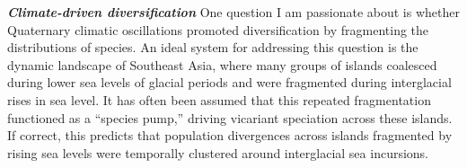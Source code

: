 \textit{\textbf{Climate-driven diversification}}
One question I am passionate about is whether Quaternary climatic oscillations
promoted diversification by fragmenting the distributions of species.
An ideal system for addressing this question is the dynamic landscape of
Southeast Asia, where many groups of islands coalesced during lower sea levels
of glacial periods and were fragmented during interglacial rises in sea level.
It has often been assumed that this repeated fragmentation functioned as a
``species pump,'' driving vicariant speciation across these islands.
If correct, this predicts that population divergences across islands fragmented
by rising sea levels were temporally clustered around interglacial sea
incursions.
%
